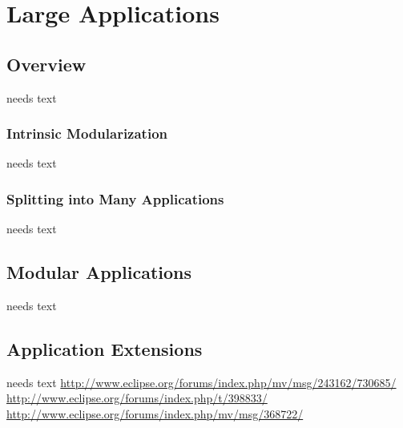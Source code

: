 \documentclass[a4paper,10pt,twoside]{book}
\begin{document}
  \sloppy
\fi


\chapter{Large Applications}

\section{Overview}
needs text

\subsection{Intrinsic Modularization}
needs text

\subsection{Splitting into Many Applications}
needs text

\section{Modular Applications}
needs text

\section{Application Extensions}
needs text
\url{http://www.eclipse.org/forums/index.php/mv/msg/243162/730685/}
\url{http://www.eclipse.org/forums/index.php/t/398833/}
\url{http://www.eclipse.org/forums/index.php/mv/msg/368722/}


\ifx\wholebook\relax\else
   
   
\end{document}
